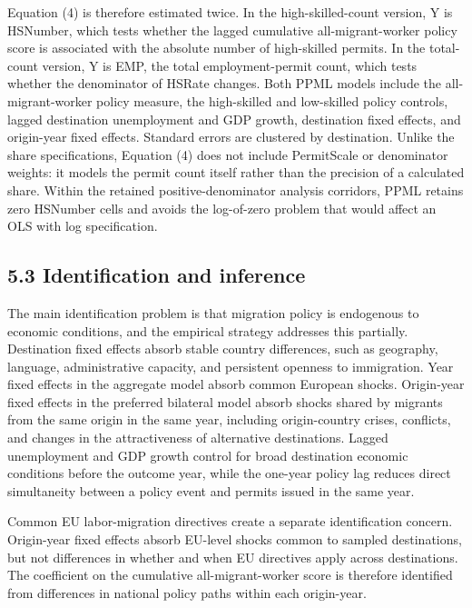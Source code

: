 \documentclass[11pt,a4paper]{article}
\begin{document}
Equation (4) is therefore estimated twice. In the high-skilled-count
version, Y is HSNumber, which tests whether the lagged cumulative
all-migrant-worker policy score is associated with the absolute number
of high-skilled permits. In the total-count version, Y is EMP, the total
employment-permit count, which tests whether the denominator of HSRate
changes. Both PPML models include the all-migrant-worker policy measure,
the high-skilled and low-skilled policy controls, lagged destination
unemployment and GDP growth, destination fixed effects, and origin-year
fixed effects. Standard errors are clustered by destination. Unlike the
share specifications, Equation (4) does not include PermitScale or
denominator weights: it models the permit count itself rather than the
precision of a calculated share. Within the retained
positive-denominator analysis corridors, PPML retains zero HSNumber
cells and avoids the log-of-zero problem that would affect an OLS with
log specification.

\subsection{5.3 Identification and
inference}\label{identification-and-inference}

The main identification problem is that migration policy is endogenous
to economic conditions, and the empirical strategy addresses this
partially. Destination fixed effects absorb stable country differences,
such as geography, language, administrative capacity, and persistent
openness to immigration. Year fixed effects in the aggregate model
absorb common European shocks. Origin-year fixed effects in the
preferred bilateral model absorb shocks shared by migrants from the same
origin in the same year, including origin-country crises, conflicts, and
changes in the attractiveness of alternative destinations. Lagged
unemployment and GDP growth control for broad destination economic
conditions before the outcome year, while the one-year policy lag
reduces direct simultaneity between a policy event and permits issued in
the same year.

Common EU labor-migration directives create a separate identification
concern. Origin-year fixed effects absorb EU-level shocks common to
sampled destinations, but not differences in whether and when EU
directives apply across destinations. The coefficient on the cumulative
all-migrant-worker score is therefore identified from differences in
national policy paths within each origin-year.
\end{document}
